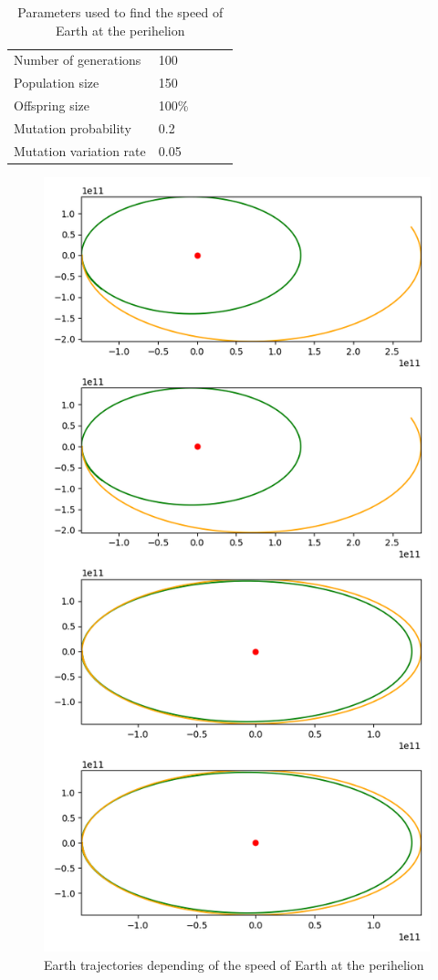 \begin{table}[H]
    \begin{tabular}{lllll}
    Number of generations & 100 \\
    Population size & 150 \\
    Offspring size & 100\% \\
    Mutation probability & 0.2 \\
    Mutation variation rate & 0.05
    \end{tabular}
    \caption{Parameters used to find the speed of Earth at the perihelion}
    \label{speed_table}
\end{table}

\begin{figure}[H]
    \center
    \includegraphics[scale=.3]{img/earth_speed.png}
    \caption{Earth trajectories depending of the speed of Earth at the perihelion}
    \label{speed_2}
\end{figure}